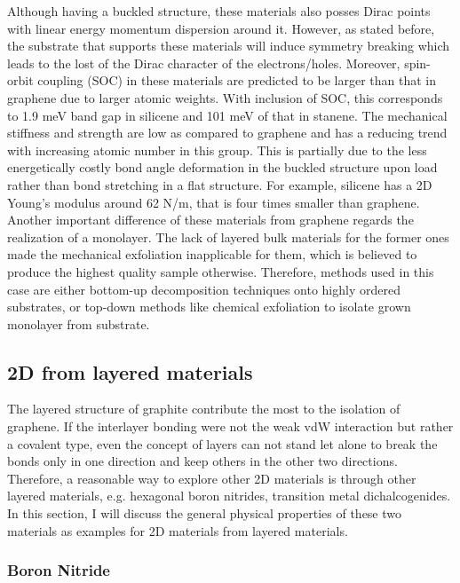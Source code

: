 Although having a buckled structure, these materials also posses Dirac points with linear energy momentum dispersion around it\cite{Garcia2011}.  However, as stated before, the substrate that supports these materials will induce symmetry breaking which leads to the lost of the Dirac character of the electrons/holes\cite{Lin2013}. Moreover, spin-orbit coupling (SOC) in these materials are predicted to be larger than that in graphene due to larger atomic weights. With inclusion of SOC, this corresponds to 1.9 meV band gap in silicene  and 101 meV of that in stanene\cite{matthes2013}. The mechanical stiffness and strength are low as compared to graphene and has a reducing trend with increasing atomic number in this group. This is partially due to the less energetically costly bond angle deformation in the buckled structure upon load rather than bond stretching in a flat structure\cite{Manjanath2014}. For example, silicene has a 2D Young's modulus around 62 \si{N/m}, that is four times smaller than graphene. Another important difference of these materials from graphene regards the realization of a monolayer. The lack of layered bulk materials for the former ones made the mechanical exfoliation inapplicable for them, which is believed to produce the highest quality sample otherwise. Therefore, methods used in this case are either bottom-up decomposition techniques onto highly ordered substrates\cite{vogt2012,li2014}, or top-down methods like chemical exfoliation to isolate grown monolayer from substrate\cite{lin2012,kaloni2013}.


\subsection{2D from layered materials}

The layered structure of graphite contribute the most to the isolation of graphene. If the interlayer bonding were not the weak vdW interaction but rather a covalent type, even the concept of layers can not stand let alone to break the bonds only in one direction and keep others in the other two directions. Therefore, a reasonable way to explore other 2D materials is through other layered materials, e.g. hexagonal boron nitrides, transition metal dichalcogenides. In this section, I will discuss the general physical properties of these two materials as examples for 2D materials from layered materials.

\subsubsection{Boron Nitride}

